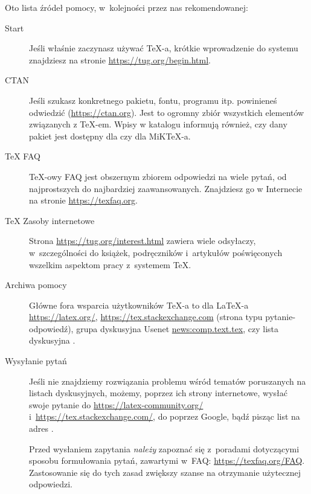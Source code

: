 \documentclass{article}
\begin{document}
Oto lista źródeł pomocy, w~kolejności przez nas rekomendowanej:
\begin{description}
\item [Start] Jeśli właśnie zaczynasz używać \TeX-a, krótkie wprowadzenie do systemu znajdziesz na stronie \url{https://tug.org/begin.html}.

\item [CTAN] Jeśli szukasz konkretnego pakietu, fontu, programu itp. powinieneś odwiedzić \CTAN{} (\url{https://ctan.org}). Jest to ogromny zbiór wszystkich elementów związanych z \TeX-em. Wpisy w katalogu informują również, czy dany pakiet jest dostępny dla \TL{}  czy dla  MiK\TeX-a. 

\item [\TeX{} FAQ] \TeX-owy FAQ jest obszernym zbiorem
odpowiedzi na wiele pytań, od najprostszych do najbardziej
zaawansowanych.  Znajdziesz go w Internecie na stronie \url{https://texfaq.org}.

\item [\TeX{} Zasoby internetowe] Strona \url{https://tug.org/interest.html}
zawiera wiele odsyłaczy, w~szczególności do książek, podręczników
i~artykułów poświęconych wszelkim aspektom pracy z~systemem \TeX.

\item [Archiwa pomocy] Główne fora wsparcia użytkowników \TeX-a to dla \LaTeX-a
\url{https://latex.org/},     
 \url{https://tex.stackexchange.com} (strona typu pytanie-odpowiedź), grupa dyskusyjna Usenet \url{news:comp.text.tex}, czy
lista dyskusyjna .
%

\item [Wysyłanie pytań] Jeśli   nie znajdziemy rozwiązania problemu wśród tematów poruszanych na listach dyskusyjnych,
możemy, poprzez ich strony internetowe, wysłać swoje pytanie do \url{https://latex-community.org/}  i~\url{https://tex.stackexchange.com/},
do  poprzez Google,
  bądź pisząc list na adres .

Przed wysłaniem zapytania \emph{należy} zapoznać się z~poradami dotyczącymi sposobu
formułowania pytań, zawartymi w~FAQ:
\url{https://texfaq.org/FAQ}. Zastosowanie się do tych zasad zwiększy szanse na otrzymanie użytecznej odpowiedzi.


\end{description}
\end{document}
